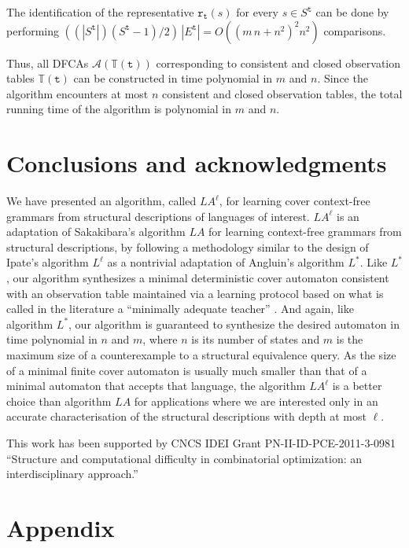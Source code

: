 \documentclass[preprint,12pt,english]{article}
\def\tr{\mathtt{r}}
\def\cA{\mathcal{A}}
\def\ty{\mathtt{t}}
\begin{document}
The identification of the representative $\tr_\ty(s)$ for every $s\in S^\ty$ can be done by performing $((|S^\ty|)(S^\ty-1)/2)\,|E^\ty|=O((m\,n+n^2)^2n^2)$ comparisons.

Thus, all DFCAs $\cA(\mathbb{T}(\ty))$ corresponding to consistent and closed observation tables $\mathbb{T}(\ty)$ can be constructed in time  polynomial in $m$ and $n$. Since the algorithm encounters at most $n$ consistent and closed observation tables, the total running time of the algorithm is polynomial in $m$ and $n$.
\section{Conclusions and acknowledgments}
\label{sect6}
We have presented an algorithm, called $LA^\ell$, for learning cover context-free grammars from structural descriptions of languages of interest. $LA^\ell$ is an adaptation of Sakakibara's algorithm $LA$ for learning context-free grammars from structural descriptions, by following a methodology similar to the design of Ipate's algorithm $L^\ell$ as a nontrivial adaptation of Angluin's algorithm $L^*$. Like $L^*$, our algorithm synthesizes  a minimal deterministic cover automaton consistent with an observation table maintained via a learning protocol based on what is called in the literature a ``minimally adequate teacher'' \cite{Angluin:87}. And again, like algorithm $L^*$, our algorithm is guaranteed to synthesize the desired automaton in time  polynomial in $n$ and $m$, where $n$ is its number of states and $m$ is the maximum size of a counterexample to a  structural equivalence query. As the size of a minimal finite cover automaton is usually much smaller than that of a minimal automaton that accepts that language, the algorithm $LA^\ell$ is a  better choice than algorithm $LA$ for applications where we are interested only in an accurate characterisation of the structural descriptions with depth at most $\ell$.

This work has been supported by CNCS IDEI Grant PN-II-ID-PCE-2011-3-0981 ``Structure and computational difficulty in combinatorial
optimization: an interdisciplinary approach.''



\newpage
\section*{Appendix}
\end{document}
